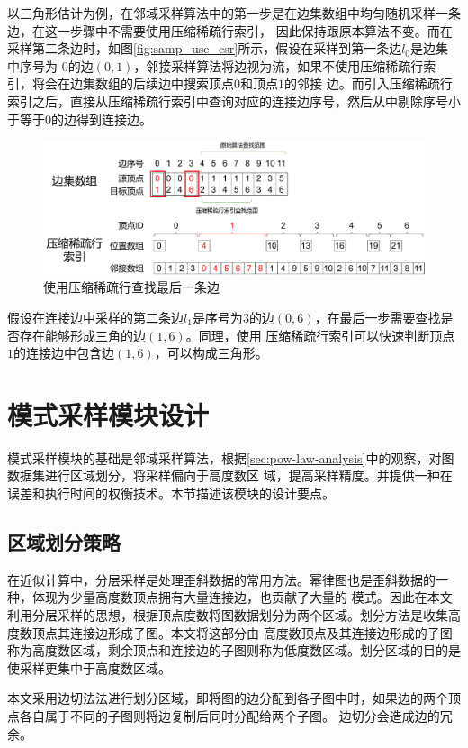 \documentclass[master]{thesis-uestc}
\begin{document}
    以三角形估计为例，在邻域采样算法中的第一步是在边集数组中均匀随机采样一条边，在这一步骤中不需要使用压缩稀疏行索引，
因此保持跟原本算法不变。而在采样第二条边时，如图\ref{fig:samp_use_csr}所示，假设在采样到第一条边$l_0$是边集中序号为
$0$的边$(0,1)$，邻接采样算法将边视为流，如果不使用压缩稀疏行索引，将会在边集数组的后续边中搜索顶点$0$和顶点$1$的邻接
边。而引入压缩稀疏行索引之后，直接从压缩稀疏行索引中查询对应的连接边序号，然后从中剔除序号小于等于$0$的边得到连接边。

\begin{figure}
    \includegraphics[width=.7\linewidth]{pic/check_use_csr.pdf}
    \caption{使用压缩稀疏行查找最后一条边}
    \label{fig:check_use_csr}
\end{figure}

    假设在连接边中采样的第二条边$l_1$是序号为$3$的边$(0,6)$，在最后一步需要查找是否存在能够形成三角的边$(1,6)$。同理，使用
压缩稀疏行索引可以快速判断顶点$1$的连接边中包含边$(1,6)$，可以构成三角形。

\section{模式采样模块设计}
\label{sec:sampling-module}

    模式采样模块的基础是邻域采样算法，根据\ref{sec:pow-law-analysis}中的观察，对图数据集进行区域划分，将采样偏向于高度数区
域，提高采样精度。并提供一种在误差和执行时间的权衡技术。本节描述该模块的设计要点。
    
\subsection{区域划分策略}
\label{subsec:partition}
    在近似计算中，分层采样是处理歪斜数据的常用方法。幂律图也是歪斜数据的一种，体现为少量高度数顶点拥有大量连接边，也贡献了大量的
模式。因此在本文利用分层采样的思想，根据顶点度数将图数据划分为两个区域。划分方法是收集高度数顶点其连接边形成子图。本文将这部分由
高度数顶点及其连接边形成的子图称为高度数区域，剩余顶点和连接边的子图则称为低度数区域。划分区域的目的是使采样更集中于高度数区域。

    本文采用边切法法进行划分区域，即将图的边分配到各子图中时，如果边的两个顶点各自属于不同的子图则将边复制后同时分配给两个子图。
边切分会造成边的冗余。
\end{document}
